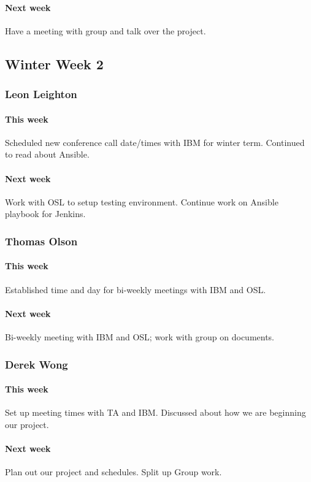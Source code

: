 \documentclass[10pt,letterpaper,onecolumn,draftclsnofoot]{IEEEtran}
\begin{document}
\paragraph{Next week}Have a meeting with group and talk over the project.


\subsection{Winter Week 2}
\subsubsection{Leon Leighton}
\paragraph{This week}Scheduled new conference call date/times with IBM for winter term.   
Continued to read about Ansible.
\paragraph{Next week}Work with OSL to setup testing environment.  
Continue work on Ansible playbook for Jenkins.


\subsubsection{Thomas Olson}
\paragraph{This week}Established time and day for bi-weekly meetings with IBM and OSL.
\paragraph{Next week}Bi-weekly meeting with IBM and OSL; work with group on documents.


\subsubsection{Derek Wong}
\paragraph{This week}Set up meeting times with TA and IBM\@.
Discussed about how we are beginning our project.
\paragraph{Next week}Plan out our project and schedules.
Split up Group work.
\end{document}
